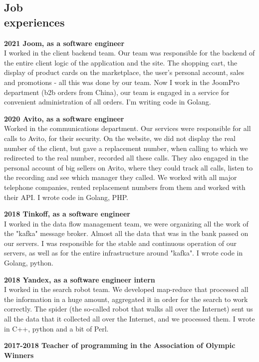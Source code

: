 \documentclass[margin,line,a4paper]{resume}
\begin{document}
\begin{resume}
\section{\mysidestyle Job \\ experiences}
    \textbf{2021 Joom, as a software engineer} \\
    I worked in the client backend team. Our team was responsible for the backend of the entire client logic of the application and the site. The shopping cart, the display of product cards on the marketplace, the user's personal account, sales and promotions - all this was done by our team. Now I work in the JoomPro department (b2b orders from China), our team is engaged in a service for convenient administration of all orders. I'm writing code in Golang. \par
    \textbf{2020 Avito, as a software engineer} \\
    Worked in the communications department. Our services were responsible for all calls to Avito, for their security. On the website, we did not display the real number of the client, but gave a replacement number, when calling to which we redirected to the real number, recorded all these calls. They also engaged in the personal account of big sellers on Avito, where they could track all calls, listen to the recording and see which manager they called. We worked with all major telephone companies, rented replacement numbers from them and worked with their API. I wrote code in Golang, PHP. \par 
    \textbf{2018 Tinkoff, as a software engineer} \\
    I worked in the data flow management team, we were organizing all the work of the "kafka" message broker. Almost all the data that was in the bank passed on our servers. I was responsible for the stable and continuous operation of our servers, as well as for the entire infrastructure around "kafka". I wrote code in Golang, python. \par
    \textbf{2018 Yandex, as a software engineer intern} \\
    I worked in the search robot team. We developed map-reduce that processed all the information in a huge amount, aggregated it in order for the search to work correctly. The spider (the so-called robot that walks all over the Internet) sent us all the data that it collected all over the Internet, and we processed them. I wrote in C++, python and a bit of Perl. \par
    \textbf{2017-2018 Teacher of programming in the  Association of Olympic Winners} \\



\end{resume}
\end{document}
